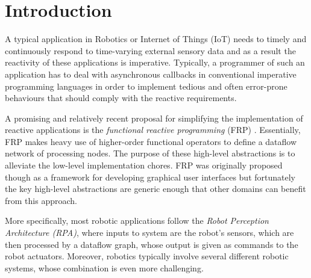 \documentclass[sigplan,review,anonymous,screen]{acmart}
\begin{document}

\maketitle

\section{Introduction} \label{sec:introduction}

A typical application in Robotics or Internet of Things (IoT) needs to timely and
continuously respond to time-varying external sensory data and as a result the
reactivity of these applications is imperative. Typically, a programmer of such an
application has to deal with asynchronous callbacks in conventional imperative
programming languages in order to implement tedious and often error-prone behaviours
that should comply with the reactive requirements.

A promising and relatively recent proposal for simplifying the implementation of
reactive applications is the \emph{functional reactive programming} (FRP) \cite{fran}.
Essentially, FRP makes heavy use of higher-order functional operators to define a
dataflow network of processing nodes. The purpose of these high-level abstractions
is to alleviate the low-level implementation chores. FRP was originally proposed
though as a framework for developing graphical user interfaces but fortunately the key
high-level abstractions are generic enough that other domains can benefit from this
approach.

More specifically, most robotic applications follow the \textit{Robot Perception
Architecture (RPA)}, where inputs to system are the robot's sensors, which are
then processed by a dataflow graph, whose output is given as commands to the
robot actuators. Moreover, robotics typically involve several different robotic
systems, whose combination is even more challenging.
\end{document}
